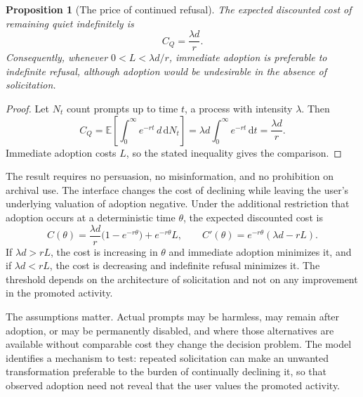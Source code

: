 \documentclass[12pt]{article}
\theoremstyle{plain}
\newtheorem{proposition}{Proposition}
\theoremstyle{definition}
\begin{document}
\begin{proposition}[The price of continued refusal]
The expected discounted cost of remaining quiet indefinitely is
\[
C_Q=\frac{\lambda d}{r}.
\]
Consequently, whenever $0<L<\lambda d/r$, immediate adoption is preferable to indefinite refusal, although adoption would be undesirable in the absence of solicitation.
\end{proposition}

\begin{proof}
Let $N_t$ count prompts up to time $t$, a process with intensity $\lambda$. Then
\[
C_Q=\mathbb{E}\left[\int_0^\infty e^{-rt}\,d\,\mathrm{d}N_t\right]
=\lambda d\int_0^\infty e^{-rt}\,\mathrm{d}t=\frac{\lambda d}{r}.
\]
Immediate adoption costs $L$, so the stated inequality gives the comparison.
\end{proof}

The result requires no persuasion, no misinformation, and no prohibition on archival use. The interface changes the cost of declining while leaving the user's underlying valuation of adoption negative. Under the additional restriction that adoption occurs at a deterministic time $\theta$, the expected discounted cost is
\[
C(\theta)=\frac{\lambda d}{r}\bigl(1-e^{-r\theta}\bigr)+e^{-r\theta}L,
\qquad
C'(\theta)=e^{-r\theta}(\lambda d-rL).
\]
If $\lambda d>rL$, the cost is increasing in $\theta$ and immediate adoption minimizes it, and if $\lambda d<rL$, the cost is decreasing and indefinite refusal minimizes it. The threshold depends on the architecture of solicitation and not on any improvement in the promoted activity.

The assumptions matter. Actual prompts may be harmless, may remain after adoption, or may be permanently disabled, and where those alternatives are available without comparable cost they change the decision problem. The model identifies a mechanism to test: repeated solicitation can make an unwanted transformation preferable to the burden of continually declining it, so that observed adoption need not reveal that the user values the promoted activity.
\end{document}
